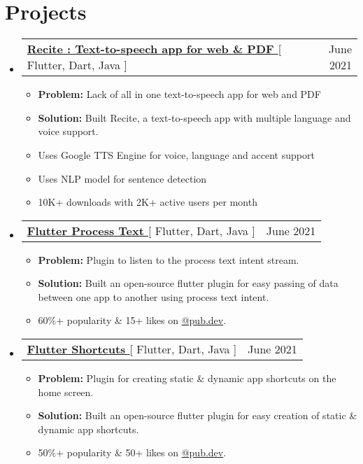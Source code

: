 \documentclass[letterpaper,11pt]{article}
\makeatletter
\newcommand{\resumeItem}[1]{
  \item\small{
    {#1 \vspace{-2pt}}
  }
}
\newcommand{\resumeProjectHeading}[2]{
    \item
    \begin{tabular*}{0.97\textwidth}{l@{\extracolsep{\fill}}r}
      \small#1 & #2 \\
    \end{tabular*}\vspace{-7pt}
}
\newcommand{\resumeSubHeadingListStart}{\begin{itemize}[leftmargin=0.15in, label={}]}
\newcommand{\resumeSubHeadingListEnd}{\end{itemize}}
\newcommand{\resumeItemListStart}{\begin{itemize}}
\newcommand{\resumeItemListEnd}{\end{itemize}\vspace{-5pt}}
\makeatother
\begin{document}
\section{Projects}
    \resumeSubHeadingListStart
      \resumeProjectHeading
          {\textbf{\href{https://play.google.com/store/apps/details?id=com.hackthedeveloper.recite}{Recite : Text-to-speech app for web \& PDF }}{[ Flutter, Dart, Java ]}}{June 2021}
          \resumeItemListStart
           \resumeItem{\textbf{Problem:} {Lack of all in one text-to-speech app for web and PDF} }
           \resumeItem{\textbf{Solution:} Built Recite, a text-to-speech app with multiple language and voice support.}
           \resumeItem{Uses Google TTS Engine for voice, language and accent support}
           \resumeItem{Uses NLP model for sentence detection}
           \resumeItem{10K+ downloads with 2K+ active users per month}
          \resumeItemListEnd
    \resumeSubHeadingListEnd
    
    \resumeSubHeadingListStart
      \resumeProjectHeading
          {\textbf{\href{https://pub.dev/packages/flutter_process_text}{Flutter Process Text }}{[ Flutter, Dart, Java ]}}{June 2021}
          \resumeItemListStart
           \resumeItem{\textbf{Problem:} Plugin to listen to the process text intent stream.}
           \resumeItem{\textbf{Solution:} Built an open-source flutter plugin for easy passing of data between one app to another using process text intent.}
           \resumeItem{60\%+ popularity \& 15+ likes on  \href{https://pub.dev/packages/flutter_process_text}{@pub.dev}.}
          \resumeItemListEnd
    \resumeSubHeadingListEnd

    \resumeSubHeadingListStart
      \resumeProjectHeading
          {\textbf{\href{https://pub.dev/packages/flutter_shortcuts}{Flutter Shortcuts }}{[ Flutter, Dart, Java ]}}{June 2021}
          \resumeItemListStart
           \resumeItem{\textbf{Problem:} Plugin for creating static \& dynamic app shortcuts on the home screen.}
           \resumeItem{\textbf{Solution:} Built an open-source flutter plugin for easy creation of static \& dynamic app shortcuts.}
           \resumeItem{50\%+ popularity \& 50+ likes on  \href{https://pub.dev/packages/flutter_shortcuts}{@pub.dev}.}
          \resumeItemListEnd
    \resumeSubHeadingListEnd


%
\end{document}
